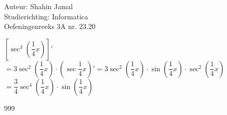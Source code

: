 \documentclass[a4paper]{article}
\begin{document}
  
\noindent \large Auteur: Shahin Jamal \\
\noindent \large Studierichting: Informatica\\
\noindent \large Oefeningenreeks 3A nr. 23.20\\

\medskip

\normalsize

$\left[\sec^3\left(\dfrac{1}{4}x\right)\right]'$\\

$= 3\sec^2\left(\dfrac{1}{4}x\right) \cdot \left(\sec\dfrac{1}{4}x\right)' = 3\sec^2\left(\dfrac{1}{4}x\right) \cdot \sin\left(\dfrac{1}{4}x\right) \cdot \sec^2\left(\dfrac{1}{4}x\right)$\\

$= \dfrac{3}{4}\sec^4\left(\dfrac{1}{4}x\right) \cdot \sin\left(\dfrac{1}{4}x\right)$\\

\begin{thebibliography}{999}
\end{thebibliography}
\end{document}
